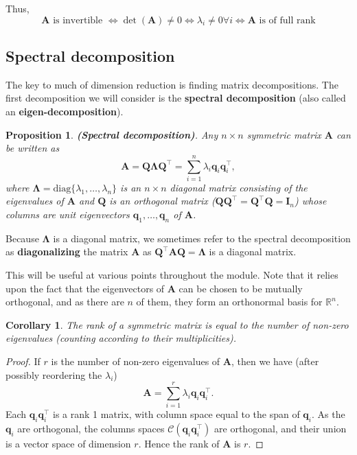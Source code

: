 \documentclass[
]{book}
\newtheorem{corollary}{Corollary}[chapter]
\newtheorem{proposition}{Proposition}[chapter]
\theoremstyle{definition}
\theoremstyle{definition}
\theoremstyle{definition}
\theoremstyle{definition}
\theoremstyle{remark}
\begin{document}
Thus,
\[\mathbf A\mbox{ is invertible } \iff  \det(\mathbf A)\not=0 \iff 
\lambda_i\not=0 \forall i \iff \mathbf A\mbox{ is of full rank}\]

\subsection{Spectral decomposition}\label{spectral-decomposition}

The key to much of dimension reduction is finding matrix decompositions. The first decomposition we will consider is the \textbf{spectral decomposition} (also called an \textbf{eigen-decomposition}).

\begin{proposition}
\protect\hypertarget{prp:spectraldecomp}{}\label{prp:spectraldecomp}\textbf{(Spectral decomposition)}. Any \(n\times n\) symmetric matrix \(\mathbf A\) can
be written as
\[\mathbf A=\mathbf Q\boldsymbol \Lambda\mathbf Q^\top = \sum _{i=1}^{n} \lambda _i \mathbf q_i \mathbf q_i^\top ,\]
where \(\boldsymbol \Lambda=\text{diag}\{ \lambda _1, \dots , \lambda _n \}\) is
an \(n \times n\) diagonal matrix consisting of the eigenvalues of \(\mathbf A\) and \(\mathbf Q\) is
an orthogonal matrix (\(\mathbf Q\mathbf Q^\top=\mathbf Q^\top \mathbf Q=\mathbf I_n\)) whose columns are unit eigenvectors
\(\mathbf q_1, \dots , \mathbf q_n\) of \(\mathbf A\).
\end{proposition}

Because \(\boldsymbol \Lambda\) is a diagonal matrix, we sometimes refer to the spectral decomposition as \textbf{diagonalizing} the matrix \(\mathbf A\) as \(\mathbf Q^\top\mathbf A\mathbf Q=\boldsymbol \Lambda\) is a diagonal matrix.

This will be useful at various points throughout the module. Note that it relies upon the fact that the eigenvectors of \(\mathbf A\) can be chosen to be mutually orthogonal, and as there are \(n\) of them, they form an orthonormal basis for \(\mathbb{R}^n\).

\begin{corollary}
\protect\hypertarget{cor:nonzeroeigen}{}\label{cor:nonzeroeigen}The rank of a symmetric matrix is equal to the number of non-zero eigenvalues (counting according to their multiplicities).
\end{corollary}

\begin{proof}
If \(r\) is the number of non-zero eigenvalues of \(\mathbf A\), then we have (after possibly reordering the \(\lambda_i\))
\[\mathbf A= \sum _{i=1}^{r} \lambda _i \mathbf q_i \mathbf q_i^\top. \]
Each \(\mathbf q_i \mathbf q_i^\top\) is a rank 1 matrix, with column space equal to the span of \(\mathbf q_i\). As the \(\mathbf q_i\) are orthogonal, the columns spaces \(\mathcal{C}(\mathbf q_i \mathbf q_i^\top)\) are orthogonal, and their union
is a vector space of dimension \(r\). Hence the rank of \(\mathbf A\) is \(r\).
\end{proof}
\end{document}
